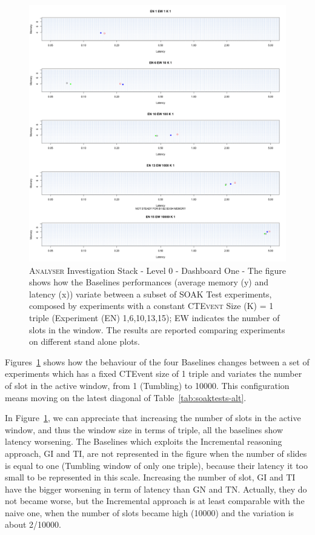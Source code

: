 \begin{figure}[t!hb]
	\centering
	\includegraphics[width=\linewidth]{images/dashboard-1-split}	
	\caption[\textsc{Analyser} Investigation Stack - Level 0 - Dashboard One - Split Version]{\textsc{Analyser} Investigation Stack - Level 0 - Dashboard One - The figure shows how the Baselines performances (average memory (y) and latency (x))  variate between a subset of SOAK Test experiments, composed by experiments with a constant \textsc{CTEvent} Size (K) = 1 triple (Experiment (EN) 1,6,10,13,15); EW indicates the number of slots in the window. The results are reported comparing experiments on different stand alone plots.} 
	\label{fig:result_dashboard_ka}
\end{figure}

Figures~\ref{fig:result_dashboard_ka} shows how the behaviour of the four Baselines changes between a set of experiments which has a fixed CTEvent size of 1 triple and variates the number of slot in the active window, from 1 (Tumbling) to 10000. This configuration means moving on the latest diagonal of Table~\ref{tab:soaktests-alt}.

In Figure~\ref{fig:result_dashboard_ka}, we can appreciate that increasing the number of slots in the active window, and thus the window size in terms of triple, all the baselines show latency worsening. The Baselines which exploits the Incremental reasoning approach, GI and TI, are not represented in the figure when the number of slides is equal to one (Tumbling window of only one triple), because their latency it too small to be represented in this scale. Increasing the number of slot, GI and TI have the bigger worsening in term of latency than GN and TN. Actually, they do not became worse, but the Incremental approach is at least comparable with the naive one, when the number of slots became high (10000) and the variation is about 2/10000.

